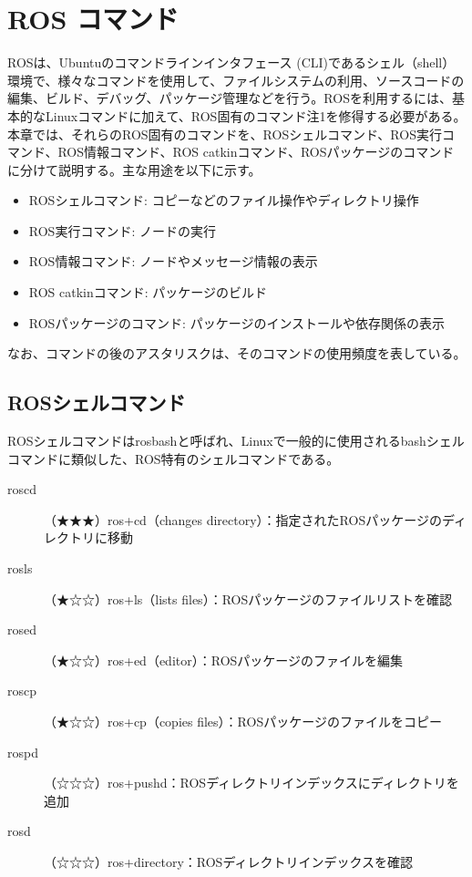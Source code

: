 
\chapter{ROS コマンド}

ROSは、Ubuntuのコマンドラインインタフェース (CLI)であるシェル（shell）環境で、様々なコマンドを使用して、ファイルシステムの利用、ソースコードの編集、ビルド、デバッグ、パッケージ管理などを行う。ROSを利用するには、基本的なLinuxコマンドに加えて、ROS固有のコマンド注1を修得する必要がある。本章では、それらのROS固有のコマンドを、ROSシェルコマンド、ROS実行コマンド、ROS情報コマンド、ROS catkinコマンド、ROSパッケージのコマンドに分けて説明する。主な用途を以下に示す。\\

\begin{itemize}
\item ROSシェルコマンド: コピーなどのファイル操作やディレクトリ操作
\item ROS実行コマンド: ノードの実行
\item ROS情報コマンド: ノードやメッセージ情報の表示
\item ROS catkinコマンド: パッケージのビルド
\item ROSパッケージのコマンド: パッケージのインストールや依存関係の表示\\
\end{itemize}

なお、コマンドの後のアスタリスクは、そのコマンドの使用頻度を表している。

\section{ROSシェルコマンド}

ROSシェルコマンドはrosbashと呼ばれ、Linuxで一般的に使用されるbashシェルコマンドに類似した、ROS特有のシェルコマンドである。

\vspace{\baselineskip}
\noindent
\begin{description}
\item[roscd]（★★★）ros+cd（changes directory）：指定されたROSパッケージのディレクトリに移動
\item[rosls] （★☆☆）ros+ls（lists files）：ROSパッケージのファイルリストを確認
\item[rosed]（★☆☆）ros+ed（editor）：ROSパッケージのファイルを編集
\item[roscp] （★☆☆）ros+cp（copies files）：ROSパッケージのファイルをコピー
\item[rospd]（☆☆☆）ros+pushd：ROSディレクトリインデックスにディレクトリを追加
\item[rosd]（☆☆☆）ros+directory：ROSディレクトリインデックスを確認\\
\end{description}

